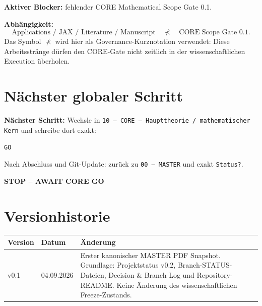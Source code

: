 \documentclass[11pt,a4paper]{article}
\begin{document}
\textbf{Aktiver Blocker:} fehlender CORE Mathematical Scope Gate 0.1.

\textbf{Abhängigkeit:}
\[
\text{Applications / JAX / Literature / Manuscript}
\quad \not\prec \quad
\text{CORE Scope Gate 0.1}.
\]
Das Symbol \(\not\prec\) wird hier als Governance-Kurznotation verwendet: Diese Arbeitsstränge dürfen den CORE-Gate nicht zeitlich in der wissenschaftlichen Execution überholen.

\section{Nächster globaler Schritt}

\begin{stopbox}
\textbf{Nächster Schritt:} Wechsle in \texttt{10 -- CORE -- Haupttheorie / mathematischer Kern} und schreibe dort exakt:

\begin{center}
\Large\texttt{GO}
\end{center}

Nach Abschluss und Git-Update: zurück zu \texttt{00 -- MASTER} und exakt \texttt{Status?}.

\textbf{STOP -- AWAIT CORE GO}
\end{stopbox}

\section{Versionhistorie}

\begin{tabularx}{\textwidth}{p{} p{} X}
\toprule
Version & Datum & Änderung \\
\midrule
v0.1 & 04.09.2026 & Erster kanonischer MASTER PDF Snapshot. Grundlage: Projektstatus v0.2, Branch-STATUS-Dateien, Decision \& Branch Log und Repository-README. Keine Änderung des wissenschaftlichen Freeze-Zustands. \\
\bottomrule
\end{tabularx}
\end{document}
